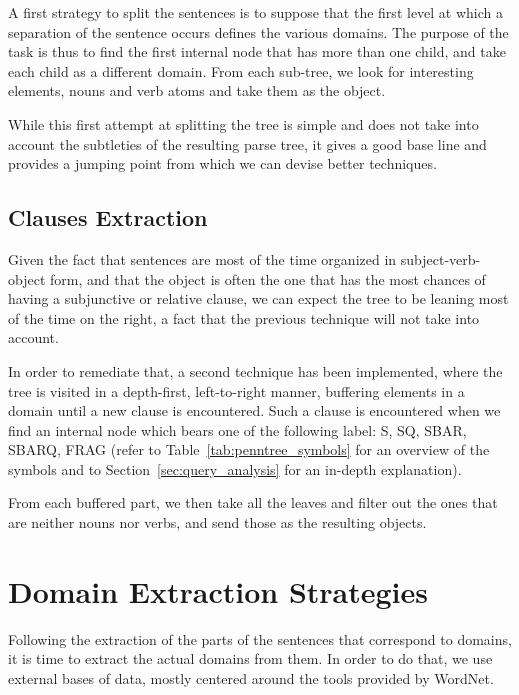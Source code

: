 A first strategy to split the sentences is to suppose that the first level at which a separation of the sentence occurs defines the various domains. The purpose of the task is thus to find the first internal node that has more than one child, and take each child as a different domain. From each sub-tree, we look for interesting elements, nouns and verb atoms and take them as the object.

While this first attempt at splitting the tree is simple and does not take into account the subtleties of the resulting parse tree, it gives a good base line and provides a jumping point from which we can devise better techniques.


\subsection{Clauses Extraction} %
\label{sub:clauses_extraction}

Given the fact that sentences are most of the time organized in subject-verb-object form, and that the object is often the one that has the most chances of having a subjunctive or relative clause, we can expect the tree to be leaning most of the time on the right, a fact that the previous technique will not take into account.

In order to remediate that, a second technique has been implemented, where the tree is visited in a depth-first, left-to-right manner, buffering elements in a domain until a new clause is encountered. Such a clause is encountered when we find an internal node which bears one of the following label: S, SQ, SBAR, SBARQ, FRAG (refer to Table~\ref{tab:penntree_symbols} for an overview of the symbols and to Section~\ref{sec:query_analysis} for an in-depth explanation).

From each buffered part, we then take all the leaves and filter out the ones that are neither nouns nor verbs, and send those as the resulting objects.



\section{Domain Extraction Strategies} %
\label{sec:domain_extraction_strategies}

Following the extraction of the parts of the sentences that correspond to domains, it is time to extract the actual domains from them. In order to do that, we use external bases of data, mostly centered around the tools provided by WordNet.

